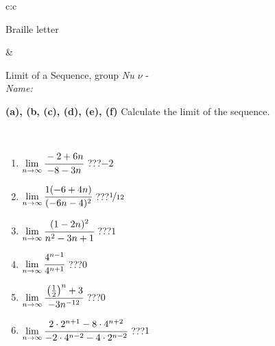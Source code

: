 \documentclass[10pt]{report}
\begin{document}
\begin{tabular}{c:c}
\begin{minipage}[c][104.5mm][t]{0.5\linewidth}
\begin{center}
\begin{minipage}{0.20\linewidth}
\begin{center}
{\small Braille letter}
\end{center}
\end{minipage}
\end{center}
\end{minipage}
&
\begin{minipage}[c][104.5mm][t]{0.5\linewidth}
\begin{center}
\vspace{5mm}
{\huge Limit of a Sequence, group \textit{Nu $\nu$} -}\\[5mm]
\textit{Name:}\phantom{xxxxxxxxxxxxxxxxxxxxxxxxxxxxxxxxxxxxxxxxxxxxxxxxxxxxxxxxxxxxxxxxx}\\[5mm]
\begin{minipage}{0.95\linewidth}
\begin{center}
{
\textbf{(a), (b, (c), (d), (e), (f)} Calculate the limit of the sequence. \\[-1mm]
\phantom{x}
}
\end{center}
\end{minipage}
\\[1mm]
\begin{minipage}{0.79\linewidth}
\begin{center}
\begin{varwidth}{\linewidth}
\setlength{\itemsep}{0pt}
\begin{enumerate}
\normalsize
\item $\lim\limits_{n\to\infty}\cfrac{-2+6n}{-8-3n}$\quad \dotfill\; ???\;\dotfill \quad $-2$
\item $\lim\limits_{n\to\infty}\cfrac{1(-6+4n)}{(-6n-4)^2}$\quad \dotfill\; ???\;\dotfill \quad $\nicefrac{1}{12}$
\item $\lim\limits_{n\to\infty}\cfrac{(1-2n)^2}{n^2-3n+1}$\quad \dotfill\; ???\;\dotfill \quad $1$
\item $\lim\limits_{n\to\infty}\cfrac{4^{n-1}}{4^{n+1}}$\quad \dotfill\; ???\;\dotfill \quad $0$
\item $\lim\limits_{n\to\infty}\cfrac{\left(\frac{1}{2}\right)^n +3}{-3n^{-12}}$\quad \dotfill\; ???\;\dotfill \quad $0$
\item $\lim\limits_{n\to\infty}\cfrac{2\cdot 2^{n+1}-8\cdot 4^{n+2}}{-2\cdot 4^{n-2}-4\cdot 2^{n-2}}$\quad \dotfill\; ???\;\dotfill \quad $1$
\end{enumerate}
\end{varwidth}
\end{center}
\end{minipage}
\begin{minipage}{0.20\linewidth}

\end{minipage}
\end{center}
\end{minipage}
\end{tabular}
\end{document}
